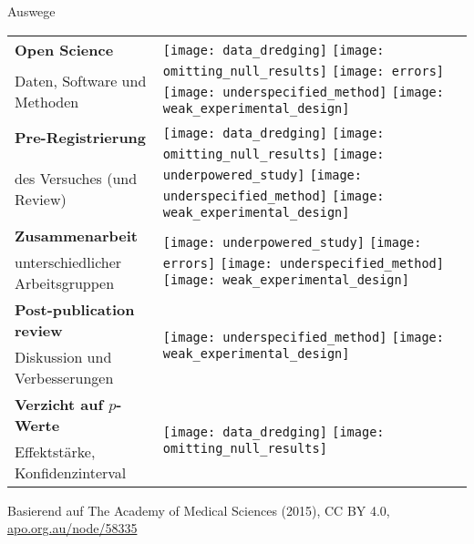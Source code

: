 \documentclass{beamer}
\begin{document}
\begin{frame}{Auswege}

    \vspace{0.5cm}

    \begin{tabular}{>{\raggedright}p{5.5cm}l}
        \textbf{Open Science} & \multirow{2}{2cm}{%
            \texttt{[image: data\_dredging]}
            \texttt{[image: omitting\_null\_results]}
            \texttt{[image: errors]}
            \texttt{[image: underspecified\_method]}
            \texttt{[image: weak\_experimental\_design]}} \\
        Daten, Software und Methoden & \\[1em]
        \textbf{Pre-Registrierung} & \multirow{2}{2cm}{%
            \texttt{[image: data\_dredging]}
            \texttt{[image: omitting\_null\_results]}
            \texttt{[image: underpowered\_study]}
            \texttt{[image: underspecified\_method]}
            \texttt{[image: weak\_experimental\_design]}} \\
        des Versuches (und Review) & \\[1em]
        \textbf{Zusammenarbeit} & \multirow{2}{*}{%
            \texttt{[image: underpowered\_study]}
            \texttt{[image: errors]}
            \texttt{[image: underspecified\_method]}
            \texttt{[image: weak\_experimental\_design]}} \\
        unterschiedlicher Arbeitsgruppen & \\[1em]
        \textbf{Post-publication review} & \multirow{2}{*}{%
            \texttt{[image: underspecified\_method]}
            \texttt{[image: weak\_experimental\_design]}} \\
        Diskussion und Verbesserungen & \\[1em]
        \textbf{Verzicht auf $p$-Werte} & \multirow{2}{*}{%
            \texttt{[image: data\_dredging]}
            \texttt{[image: omitting\_null\_results]}} \\
        Effektstärke, Konfidenzinterval
        & \\
    \end{tabular}

    \vspace{1cm}
    {\ft Basierend auf The Academy of Medical Sciences (2015), CC
    BY 4.0, \href{http://apo.org.au/node/58335}{apo.org.au/node/58335}}

\end{frame}
\end{document}
